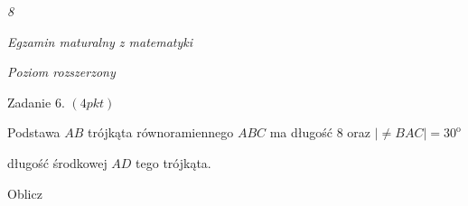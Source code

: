 \documentclass[a4paper,12pt]{article}
\begin{document}
{\it 8}

{\it Egzamin maturalny z matematyki}

{\it Poziom rozszerzony}

Zadanie 6. $(4pkt)$

Podstawa $AB$ trójkąta równoramiennego $ABC$ ma długość 8 oraz $|\neq BAC|=30^{\mathrm{o}}$

długość środkowej $AD$ tego trójkąta.

Oblicz
\end{document}
